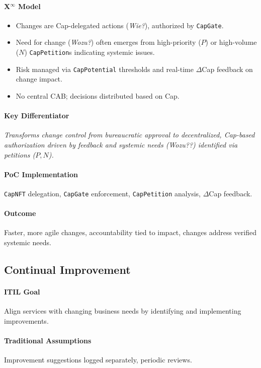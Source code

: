 \documentclass[12pt, a4paper]{scrartcl}
\newcommand{\Xinf}{X$^\infty$}                        %
\newcommand{\DeltaCap}{$\Delta$Cap}                    %
\newcommand{\CapPotential}{\texttt{CapPotential}}    %
\newcommand{\CapNFT}{\texttt{CapNFT}}
\newcommand{\CapGate}{\texttt{CapGate}}
\newcommand{\CapPetition}{\texttt{CapPetition}}        %
\newcommand{\Wozu}{\textit{Wozu?}}                      %
\newcommand{\Wie}{\textit{Wie?}}                        %
\begin{document}
\paragraph*{\Xinf{} Model}
\begin{itemize}
    \item Changes are Cap-delegated actions (\Wie{}), authorized by \CapGate{}.
    \item Need for change (\Wozu{}) often emerges from high-priority ($P$) or high-volume ($N$) \CapPetition{}s indicating systemic issues.
    \item Risk managed via \CapPotential{} thresholds and real-time \DeltaCap{} feedback on change impact.
    \item No central CAB; decisions distributed based on Cap.
\end{itemize}
\paragraph{Key Differentiator} \textit{Transforms change control from bureaucratic approval to decentralized, Cap-based authorization driven by feedback and systemic needs (\Wozu?) identified via petitions ($P,N$).}
\paragraph{PoC Implementation} \CapNFT{} delegation, \CapGate{} enforcement, \CapPetition{} analysis, \DeltaCap{} feedback.
\paragraph{Outcome} Faster, more agile changes, accountability tied to impact, changes address verified systemic needs.

\subsection{Continual Improvement} %
\paragraph{ITIL Goal} Align services with changing business needs by identifying and implementing improvements.
\paragraph{Traditional Assumptions} Improvement suggestions logged separately, periodic reviews.
\end{document}
